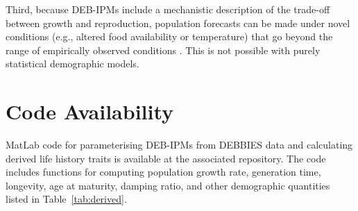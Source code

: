 \documentclass[11pt]{article}
\begin{document}
Third, because DEB-IPMs include a mechanistic description of the trade-off between growth and reproduction, population forecasts can be made under novel conditions (e.g., altered food availability or temperature) that go beyond the range of empirically observed conditions \citep{smallegange2023, coulson2021}. This is not possible with purely statistical demographic models.

\section{Code Availability}

MatLab code for parameterising DEB-IPMs from DEBBIES data and calculating derived life history traits is available at the associated repository. The code includes functions for computing population growth rate, generation time, longevity, age at maturity, damping ratio, and other demographic quantities listed in Table~\ref{tab:derived}.



\end{document}
